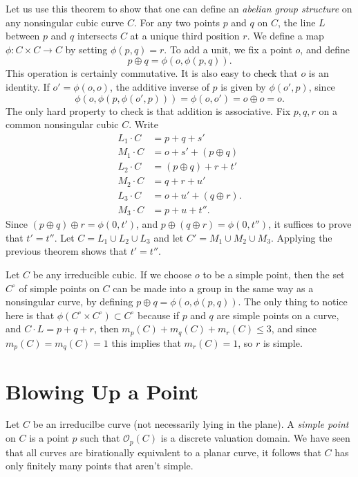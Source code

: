 Let us use this theorem to show that one can define an \emph{abelian group structure} on any nonsingular cubic curve $C$. For any two points $p$ and $q$ on $C$, the line $L$ between $p$ and $q$ intersects $C$ at a unique third position $r$. We define a map $\phi: C \times C \to C$ by setting $\phi(p,q) = r$. To add a unit, we fix a point $o$, and define
%
\[ p \oplus q = \phi(o,\phi(p,q)). \]
%
This operation is certainly commutative. It is also easy to check that $o$ is an identity. If $o' = \phi(o,o)$, the additive inverse of $p$ is given by $\phi(o',p)$, since
%
\[ \phi(o,\phi(p,\phi(o',p))) = \phi(o,o') = o \oplus o = o. \]
%
The only hard property to check is that addition is associative. Fix $p,q,r$ on a common nonsingular cubic $C$. Write
%
\begin{align*}
    L_1 \cdot C &= p + q + s'\\
    M_1 \cdot C &= o + s' + (p \oplus q)\\
    L_2 \cdot C &= (p \oplus q) + r + t'\\
    M_2 \cdot C &= q + r + u'\\
    L_3 \cdot C &= o + u' + (q \oplus r).\\
    M_3 \cdot C &= p + u + t''.
\end{align*}
%
Since $(p \oplus q) \oplus r = \phi(0,t')$, and $p \oplus (q \oplus r) = \phi(0,t'')$, it suffices to prove that $t' = t''$. Let $C = L_1 \cup L_2 \cup L_3$ and let $C' = M_1 \cup M_2 \cup M_3$. Applying the previous theorem shows that $t' = t''$.

\begin{remark}
    Let $C$ be any irreducible cubic. If we choose $o$ to be a simple point, then the set $C^\circ$ of simple points on $C$ can be made into a group in the same way as a nonsingular curve, by defining $p \oplus q = \phi(o,\phi(p,q))$. The only thing to notice here is that $\phi(C^\circ \times C^\circ) \subset C^\circ$ because if $p$ and $q$ are simple points on a curve, and $C \cdot L = p + q + r$, then $m_p(C) + m_q(C) + m_r(C) \leq 3$, and since $m_p(C) = m_q(C) = 1$ this implies that $m_r(C) = 1$, so $r$ is simple.
\end{remark}



\section{Blowing Up a Point}

Let $C$ be an irreducilbe curve (not necessarily lying in the plane). A \emph{simple point} on $C$ is a point $p$ such that $\mathcal{O}_p(C)$ is a discrete valuation domain. We have seen that all curves are birationally equivalent to a planar curve, it follows that $C$ has only finitely many points that aren't simple.

